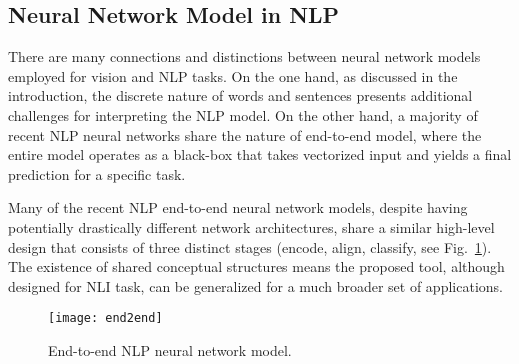 

\subsection{Neural Network Model in NLP}
There are many connections and distinctions between neural network models employed for vision and NLP tasks.
On the one hand, as discussed in the introduction, the discrete nature of words and sentences presents additional challenges for
interpreting the NLP model.
%
On the other hand, a majority of recent NLP neural networks share the nature of
end-to-end model, where the entire model operates as a black-box that takes
vectorized input and yields a final prediction for a specific task.
%

Many of the recent NLP end-to-end neural network models, despite having potentially drastically different network architectures, share a similar high-level design that consists of three distinct stages (encode, align, classify, see Fig.~\ref{fig:modelPipeline}).
%
The existence of shared conceptual structures means the proposed tool, although designed for NLI task, can be generalized for a much broader set of applications.

\begin{figure}[htbp]
\centering
 \texttt{[image: end2end]}
 \vspace{-2mm}
 \caption{End-to-end NLP neural network model.}
  \vspace{-2mm}
\label{fig:modelPipeline}
\end{figure}

